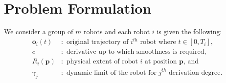\documentclass{svproc}
\newcommand{\vp}{\mathbf{p}}
\newcommand{\vo}{\mathbf{o}}
\newcommand{\cO}{\mathcal{O}}
\newcommand{\todo}[1]{\textbf{\textcolor{red}{TODO: #1}}}
\begin{document}

\section{Problem Formulation} \label{problemFormulation}

We consider a group of $m$ robots and each robot $i$ is given the following:
\begin{align*}
    \vo_i(t)&:\text{ original trajectory of $i^{th}$ robot where } t\in[0,T_i],\\
    c&:\text{ derivative up to which smoothness is required},\\
    R_i(\vp)&:\text{ physical extent of robot $i$ at position $\vp$, and}\\
    \gamma_j&: \text{ dynamic limit of the robot for $j^{th}$ derivation degree}.%
\end{align*}
\end{document}
